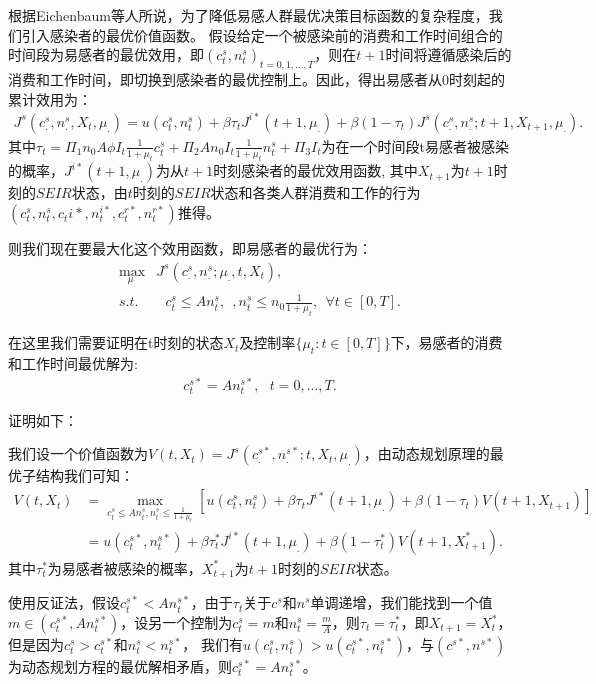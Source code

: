 根据Eichenbaum\cite{eichenbaum2021macroeconomics}等人所说，为了降低易感人群最优决策目标函数的复杂程度，我们引入感染者的最优价值函数。
假设给定一个被感染前的消费和工作时间组合的时间段为易感者的最优效用，即$(c_t^s,n_t^s)_{t=0,1,...,T}$，则在$t+1$时间将遵循感染后的消费和工作时间，即切换到感染者的最优控制上。因此，得出易感者从0时刻起的累计效用为：
\begin{align}
    J^s(c_{.}^{s},n_{.}^{s},X_t,\mu_.)=u(c_t^s,n_t^s)+\beta \tau_t J^{i*}(t+1,\mu_.)+\beta(1-\tau_t)J^s(c_.^s,n_.^s;t+1,X_{t+1},\mu_.).
\end{align}
其中$\tau_t=\Pi_1 n_0 A \phi I_t \frac{1}{1+\mu_t} c_t^s+\Pi_2 A n_0 I_t \frac{1}{1+\mu_t} n_t^s+\Pi_3 I_t$为在一个时间段t易感者被感染的概率，$J^{i*}(t+1,\mu_.)$为从$t+1$时刻感染者的最优效用函数,
其中$X_{t+1}$为$t+1$时刻的$SEIR$状态，由$t$时刻的$SEIR$状态和各类人群消费和工作的行为$(c_t^s,n_t^s,c_t{i*},n_t^{i*},c_t^{r*},n_t^{r*})$推得。

则我们现在要最大化这个效用函数，即易感者的最优行为：
\begin{equation}
    \begin{aligned}
    \max_{\mu_{.}}&J^s(c_.^s,n_.^s;\mu_{.},t,X_t), \\
    s.t.& \ \ \ c_t^s \leq A n_t^s,\ \ , n_t^s \leq n_0 \frac{1}{1+\mu_t}, \ \ \forall t \in [0,T].
    \end{aligned}
\end{equation}

在这里我们需要证明在t时刻的状态$X_t$及控制率$\{\mu_t:t\in[0,T]\}$下，易感者的消费和工作时间最优解为:
\begin{align}
    c_t^{s*}=A n_t^{s*}, \ \ \ t=0,...,T.
\end{align}

证明如下：

我们设一个价值函数为$V(t,X_t)=J^s(c_.^{s*},n_.^{s*};t,X_t,\mu_.)$，由动态规划原理的最优子结构我们可知：
\begin{align*}
    V(t,X_t)&=\max_{c_t^s \leq A n_t^s,n_t^s \leq \frac{1}{1+\mu_t}} [u(c_t^s,n_t^s)+\beta \tau_t J^{i*}(t+1,\mu_.)+\beta(1-\tau_t)V(t+1,X_{t+1})] \\
    &=u(c_t^{s*},n_t^{s*})+\beta \tau_t^{*}J^{i*}(t+1,\mu_.)+\beta(1-\tau_t^*)V(t+1,X_{t+1}^*).
\end{align*}
其中$\tau_t^*$为易感者被感染的概率，$X_{t+1}^*$为$t+1$时刻的$SEIR$状态。

使用反证法，假设$c_t^{s*} < An_t^{s*}$，由于$\tau_t$关于$c^s$和$n^s$单调递增，我们能找到一个值$m \in (c_t^{s*},An_t^{s*})$，设另一个控制为$c_t^s=m$和$n_t^s=\frac{m}{A}$，则$\tau_t=\tau_t^*$，即$X_{t+1}=X_t^*$，但是因为$c_t^s > c_t^{s*}$和$n_t^s<n_t^{s*}$，
我们有$u(c_t^s,n_t^s)>u(c_t^{s*},n_t^{s*})$，与$(c^{s*},n^{s*})$为动态规划方程的最优解相矛盾，则$c_t^{s*}=An_t^{s*}$。

